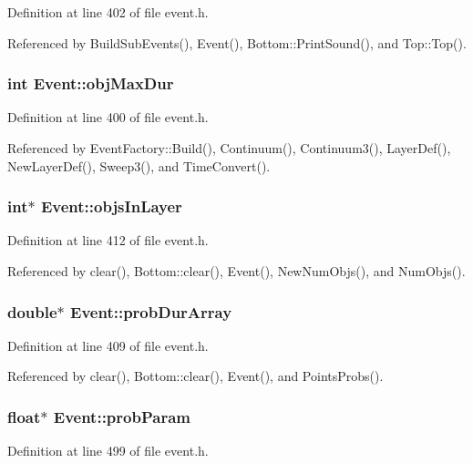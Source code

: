 Definition at line 402 of file event.h.

Referenced by Build\-Sub\-Events(), Event(), Bottom::Print\-Sound(), and Top::Top().
\subsubsection{\setlength{\rightskip}{0pt plus 5cm}int {\bf Event::obj\-Max\-Dur}}\label{classEvent_o14}




Definition at line 400 of file event.h.

Referenced by Event\-Factory::Build(), Continuum(), Continuum3(), Layer\-Def(), New\-Layer\-Def(), Sweep3(), and Time\-Convert().
\subsubsection{\setlength{\rightskip}{0pt plus 5cm}int$\ast$ {\bf Event::objs\-In\-Layer}}\label{classEvent_o33}




Definition at line 412 of file event.h.

Referenced by clear(), Bottom::clear(), Event(), New\-Num\-Objs(), and Num\-Objs().
\subsubsection{\setlength{\rightskip}{0pt plus 5cm}double$\ast$ {\bf Event::prob\-Dur\-Array}}\label{classEvent_o31}




Definition at line 409 of file event.h.

Referenced by clear(), Bottom::clear(), Event(), and Points\-Probs().
\subsubsection{\setlength{\rightskip}{0pt plus 5cm}float$\ast$ {\bf Event::prob\-Param}}\label{classEvent_o50}




Definition at line 499 of file event.h.

